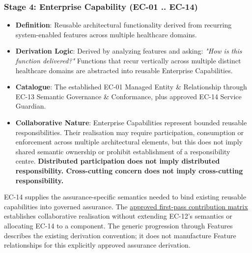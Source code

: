 \subsubsection*{Stage 4: Enterprise Capability (EC-01 .. EC-14)}
\label{rad:tier-model:130}

\begin{itemize}

\item 
\textbf{Definition}: Reusable architectural functionality derived from recurring system-enabled features across multiple healthcare domains.



\item 
\textbf{Derivation Logic}: Derived by analyzing features and asking: \emph{"How is this function delivered?"} Functions that recur vertically across multiple distinct healthcare domains are abstracted into reusable Enterprise Capabilities.



\item 
\textbf{Catalogue}: The established EC-01 Managed Entity \& Relationship through EC-13 Semantic Governance \& Conformance, plus approved EC-14 Service Guardian.



\item 
\textbf{Collaborative Nature}: Enterprise Capabilities represent bounded reusable responsibilities. Their realisation may require participation, consumption or enforcement across multiple architectural elements, but this does not imply shared semantic ownership or prohibit establishment of a responsibility centre. \textbf{Distributed participation does not imply distributed responsibility. Cross-cutting concern does not imply cross-cutting responsibility.}



\end{itemize}
\label{rad:tier-model:135}

EC-14 supplies the assurance-specific semantics needed to bind existing reusable capabilities into governed assurance. The \hyperref[rad:assurance-strategy:54]{approved first-pass contribution matrix} establishes collaborative realisation without extending EC-12's semantics or allocating EC-14 to a component. The generic progression through Features describes the existing derivation convention; it does not manufacture Feature relationships for this explicitly approved assurance derivation.

